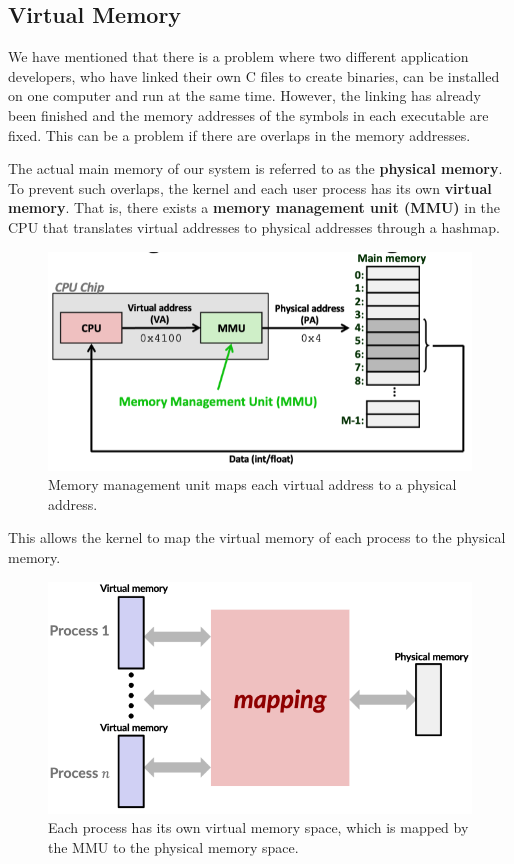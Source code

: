 \documentclass{article}
\begin{document}
  \subsection{Virtual Memory}

    We have mentioned that there is a problem where two different application developers, who have linked their own C files to create binaries, can be installed on one computer and run at the same time. However, the linking has already been finished and the memory addresses of the symbols in each executable are fixed. This can be a problem if there are overlaps in the memory addresses. 

    \begin{definition}
      The actual main memory of our system is referred to as the \textbf{physical memory}. To prevent such overlaps, the kernel and each user process has its own \textbf{virtual memory}. That is, there exists a \textbf{memory management unit (MMU)} in the CPU that translates virtual addresses to physical addresses through a hashmap. 
      \begin{figure}[H]
        \centering 
        \includegraphics[scale=0.4]{img/mmu.png}
        \caption{Memory management unit maps each virtual address to a physical address.} 
        \label{fig:mmu}
      \end{figure}
      This allows the kernel to map the virtual memory of each process to the physical memory.
      \begin{figure}[H]
        \centering 
        \includegraphics[scale=0.4]{img/vm_map.png}
        \caption{Each process has its own virtual memory space, which is mapped by the MMU to the physical memory space. } 
        \label{fig:vm_map}
      \end{figure}
    \end{definition}
\end{document}
